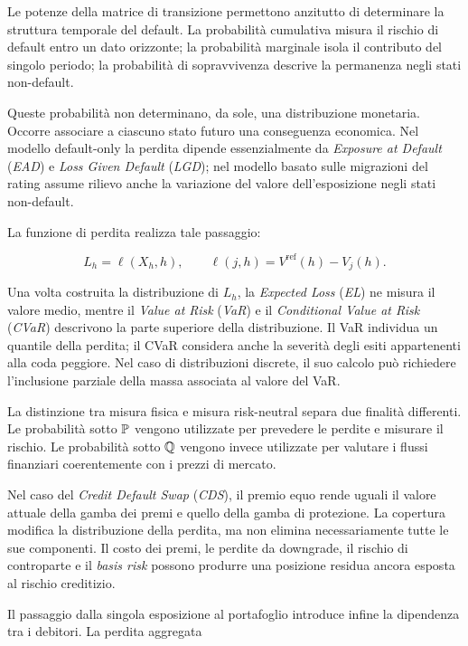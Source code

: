 Le potenze della matrice di transizione permettono anzitutto di
determinare la struttura temporale del default. La probabilit\`{a}
cumulativa misura il rischio di default entro un dato orizzonte; la
probabilit\`{a} marginale isola il contributo del singolo periodo; la
probabilit\`{a} di sopravvivenza descrive la permanenza negli stati
non-default.

Queste probabilit\`{a} non determinano, da sole, una distribuzione
monetaria. Occorre associare a ciascuno stato futuro una conseguenza
economica. Nel modello default-only la perdita dipende essenzialmente
da \emph{Exposure at Default} (\emph{EAD}) e \emph{Loss Given Default}
(\emph{LGD}); nel modello basato sulle migrazioni del rating assume
rilievo anche la variazione del valore dell'esposizione negli stati
non-default.

La funzione di perdita realizza tale passaggio:

\[
L_h=\ell(X_h,h),
\qquad
\ell(j,h)=V^{\mathrm{ref}}(h)-V_j(h).
\]

Una volta costruita la distribuzione di $L_h$, la
\emph{Expected Loss} (\emph{EL}) ne misura il valore medio, mentre il
\emph{Value at Risk} (\emph{VaR}) e il \emph{Conditional Value at
Risk} (\emph{CVaR}) descrivono la parte superiore della distribuzione.
Il VaR individua un quantile della perdita; il CVaR considera anche la
severit\`{a} degli esiti appartenenti alla coda peggiore. Nel caso di
distribuzioni discrete, il suo calcolo pu\`{o} richiedere l'inclusione
parziale della massa associata al valore del VaR.

La distinzione tra misura fisica e misura risk-neutral separa due
finalit\`{a} differenti. Le probabilit\`{a} sotto $\mathbb{P}$ vengono
utilizzate per prevedere le perdite e misurare il rischio. Le
probabilit\`{a} sotto $\mathbb{Q}$ vengono invece utilizzate per valutare i
flussi finanziari coerentemente con i prezzi di mercato.

Nel caso del \emph{Credit Default Swap} (\emph{CDS}), il premio equo
rende uguali il valore attuale della gamba dei premi e quello della
gamba di protezione. La copertura modifica la distribuzione della
perdita, ma non elimina necessariamente tutte le sue componenti. Il
costo dei premi, le perdite da downgrade, il rischio di controparte e
il \emph{basis risk} possono produrre una posizione residua ancora
esposta al rischio creditizio.

Il passaggio dalla singola esposizione al portafoglio introduce infine
la dipendenza tra i debitori. La perdita aggregata

